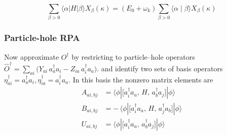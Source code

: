 \begin{equation}
\sum_{\beta>0}\langle\alpha| H|\beta\rangle X_\beta(\kappa)=\left(E_0+\omega_k\right) \sum_{\beta>0}\langle\alpha \mid \beta\rangle X_\beta(\kappa)
\end{equation}
\subsubsection{Particle-hole RPA}
\noindent Now approximate \(O^\dagger\) by restricting to particle–hole operators $
\hat O^\dagger
=\sum_{a i}\bigl(Y_{a i}\,a_a^\dagger a_i - Z_{i a}\,a_i^\dagger a_a\bigr).$ and identify two sets of basis operators $
\eta_{a i}^\dagger = a_a^\dagger a_i,
\eta_{i a}^\dagger = a_i^\dagger a_a.$
In this basis the nonzero matrix elements are
\begin{align}
A_{ai,bj}
&=\langle\phi|\bigl[a_i^\dagger a_a,\,H,\,a_b^\dagger a_j\bigr]|\phi\rangle\\
B_{ai,bj}
&=-\,\langle\phi|\bigl[a_i^\dagger a_a,\,H,\,a_j^\dagger a_b\bigr]|\phi\rangle \\
U_{ai,bj}
&=\langle\phi|\bigl[a_i^\dagger a_a,\,a_b^\dagger a_j\bigr]|\phi\rangle
\end{align}

\medskip

